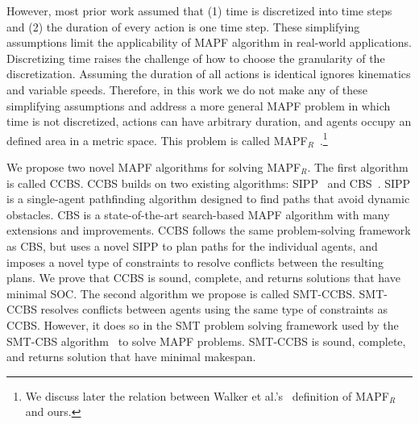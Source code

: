 \documentclass[review]{elsarticle}
\newcommand\konstantin[1]{\nb{\textbf{Konstantin:}}{red}{#1}}
\newcommand\roni[1]{\nb{\textbf{Roni:}}{green}{#1}}
\newcommand{\smt}{\ac{SMT}\xspace}
\newcommand{\ccbs}{\ac{CCBS}\xspace}
\newcommand{\cbs}{\ac{CBS}\xspace}
\newcommand{\sipp}{\ac{SIPP}\xspace}
\newcommand{\mapfr}{\ac{MAPF}$_R$\xspace}
\newcommand{\smtcbsO}{SMT-CBS\xspace} %
\newcommand{\smtccbs}{SMT-CCBS\xspace}
\newcommand{\mapf}{\ac{MAPF}\xspace}
\begin{document}
However, most prior work assumed that 
(1) time is discretized into time steps and
(2) the duration of every action is one time step. 
These simplifying assumptions limit the applicability of \mapf algorithm in real-world applications. Discretizing time raises the challenge of how to choose the granularity of the discretization. Assuming the duration of all actions is identical ignores kinematics and variable speeds. 
Therefore, in this work we do not make any of these simplifying assumptions and address a more general \mapf problem in which time is not discretized, actions can have arbitrary duration, and agents occupy an defined area in a metric space. This problem is called \mapfr~\cite{walker2018extended}.\footnote{We discuss later the relation between Walker et al.'s~\cite{walker2018extended} definition of \mapfr and ours.}


We propose two novel \mapf algorithms for solving \mapfr. 
The first algorithm is called \ccbs. \ccbs builds on two existing algorithms: 
\sipp~\cite{phillips2011sipp} and \cbs~\cite{sharon2015conflict}. 
\sipp is a  single-agent pathfinding algorithm designed to find paths that avoid dynamic obstacles. %
\cbs is a state-of-the-art search-based \mapf algorithm with many extensions and improvements. 
\ccbs follows the same problem-solving framework as \cbs, but uses a novel \sipp to plan paths for the individual agents, and imposes a novel type of constraints to resolve conflicts between the resulting plans. We prove that \ccbs is sound, complete, and returns solutions that have minimal SOC. 
The second algorithm we propose is called \smtccbs. 
\smtccbs resolves conflicts between agents using the same type of constraints as \ccbs. 
However, it does so in the \smt problem solving framework used by the \smtcbsO algorithm~\cite{DBLP:conf/ijcai/Surynek19} to solve \mapf problems. 
\smtccbs is sound, complete, and returns solution that have minimal makespan. 
\end{document}
